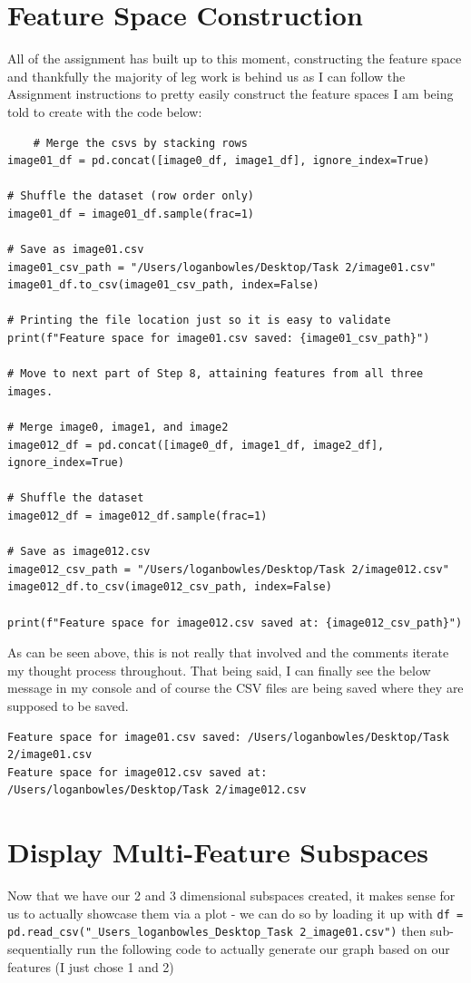 \documentclass[conference]{IEEEtran} %
\begin{document}
\section{Feature Space Construction}
All of the assignment has built up to this moment, constructing the feature space and thankfully the majority of leg work is behind us as I can follow the Assignment instructions to pretty easily construct the feature spaces I am being told to create with the code below:

\begin{lstlisting}
    # Merge the csvs by stacking rows
image01_df = pd.concat([image0_df, image1_df], ignore_index=True)

# Shuffle the dataset (row order only)
image01_df = image01_df.sample(frac=1)  

# Save as image01.csv
image01_csv_path = "/Users/loganbowles/Desktop/Task 2/image01.csv"
image01_df.to_csv(image01_csv_path, index=False)

# Printing the file location just so it is easy to validate
print(f"Feature space for image01.csv saved: {image01_csv_path}")

# Move to next part of Step 8, attaining features from all three images.

# Merge image0, image1, and image2
image012_df = pd.concat([image0_df, image1_df, image2_df], ignore_index=True)

# Shuffle the dataset
image012_df = image012_df.sample(frac=1)

# Save as image012.csv
image012_csv_path = "/Users/loganbowles/Desktop/Task 2/image012.csv"
image012_df.to_csv(image012_csv_path, index=False)

print(f"Feature space for image012.csv saved at: {image012_csv_path}")
\end{lstlisting}
As can be seen above, this is not really that involved and the comments iterate my thought process throughout.  That being said, I can finally see the below message in my console and of course the CSV files are being saved where they are supposed to be saved.
\begin{lstlisting}
Feature space for image01.csv saved: /Users/loganbowles/Desktop/Task 2/image01.csv
Feature space for image012.csv saved at: /Users/loganbowles/Desktop/Task 2/image012.csv
\end{lstlisting}

\section{Display Multi-Feature Subspaces}
Now that we have our 2 and 3 dimensional subspaces created, it makes sense for us to actually showcase them via a plot - we can do so by loading it up with 
\texttt{df = pd.read\_csv("\_Users\_loganbowles\_Desktop\_Task\ 2\_image01.csv")}
then sub-sequentially run the following code to actually generate our graph based on our features (I just chose 1 and 2)
\end{document}
